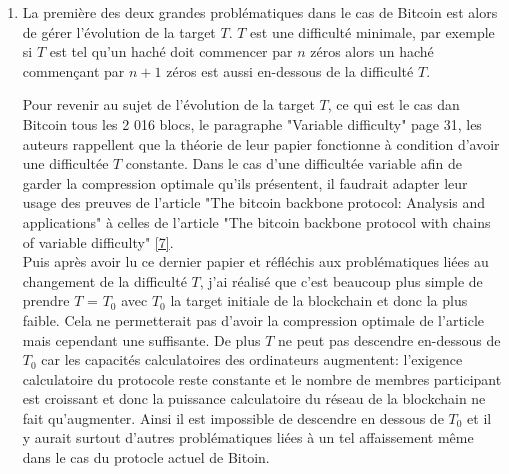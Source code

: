 \documentclass[12pt,a4paper]{article}
\newcommand{\source}[1]{\hyperlink{#1}{[#1]}}
\begin{document}
	\begin{enumerate}
	\item La première des deux grandes problématiques dans le cas de Bitcoin est alors de gérer l'évolution de la target $T$. $T$ est une difficulté minimale, par exemple si $T$ est tel qu'un haché doit commencer par $n$ zéros alors un haché commençant par $n + 1$ zéros est aussi en-dessous de la difficulté $T$. %
	
	Pour revenir au sujet de l'évolution de la target $T$, ce qui est le cas dan Bitcoin tous les 2 016 blocs, le paragraphe "Variable difficulty" page 31, les auteurs rappellent que la théorie de leur papier fonctionne à condition d'avoir une difficultée $T$ constante. Dans le cas d'une difficultée variable afin de garder la compression optimale qu'ils présentent, il faudrait adapter leur usage des preuves de l'article "The bitcoin backbone protocol: Analysis and applications" à celles de l'article "The bitcoin backbone protocol with chains of variable difficulty" \source{7}.\\ %
	Puis après avoir lu ce dernier papier et réfléchis aux problématiques liées au changement de la difficulté $T$, j'ai réalisé que c'est beaucoup plus simple de prendre $T$ = $T_0$ avec $T_0$ la target initiale de la blockchain et donc la plus faible. Cela ne permetterait pas d'avoir la compression optimale de l'article mais cependant une suffisante. De plus $T$ ne peut pas descendre en-dessous de $T_0$ car les capacités calculatoires des ordinateurs augmentent: l'exigence calculatoire du protocole reste constante et le nombre de membres participant est croissant et donc la puissance calculatoire du réseau de la blockchain ne fait qu'augmenter. Ainsi il est impossible de descendre en dessous de $T_0$ et il y aurait surtout d'autres problématiques liées à un tel affaissement même dans le cas du protocle actuel de Bitoin.\\ %
	

\end{enumerate}
\end{document}
